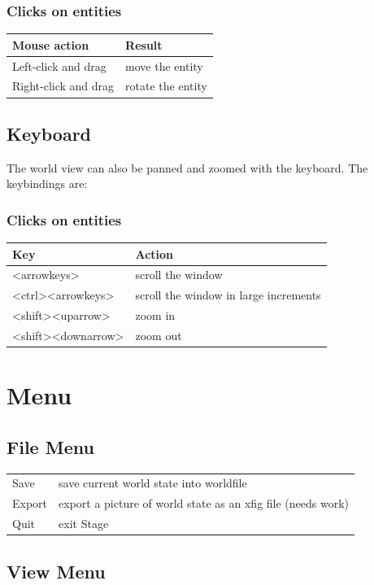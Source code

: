 \documentclass[11pt,twoside]{report}
\begin{document}
\subsubsection*{Clicks on entities}
\begin{tabular}{|l|l|}
\hline Mouse action & Result\\\hline
Left-click and drag & move the entity\\
Right-click and drag & rotate the entity\\
\hline
\end{tabular}

\subsection{Keyboard}
The world view can also be panned and zoomed with the keyboard. The
keybindings are:

\subsubsection*{Clicks on entities}
\begin{tabular}{|l|l|}
\hline Key & Action\\ \hline
<arrowkeys>        & scroll the window \\
<ctrl><arrowkeys>  & scroll the window in large increments \\
<shift><uparrow>   & zoom in \\
<shift><downarrow> & zoom out \\
\hline 
\end{tabular}

\section{Menu}

\subsection{File Menu}

\begin{tabular}{|l|l|}
\hline 
Save & save current world state into worldfile\\
Export & export a picture of world state as an xfig file (needs work)\\
Quit & exit Stage\\
\hline
\end{tabular}

\subsection{View Menu}
\end{document}

